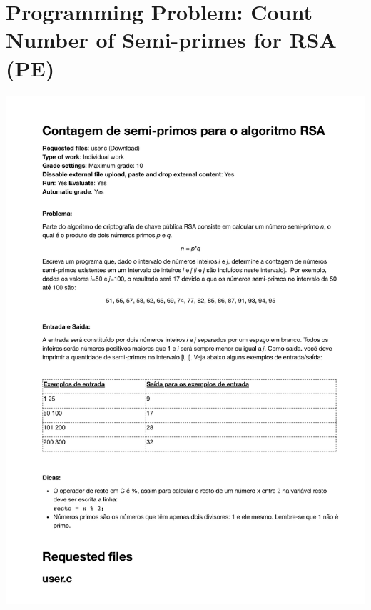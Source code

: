 \section{Programming Problem: Count Number of Semi-primes for RSA (PE)}
\label{annex:second-study-pE}
\includegraphics[page=1,width=1\textwidth]{images/annex/second-study-pE.pdf}

\newpage
